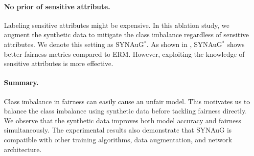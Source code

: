 \paragraph{No prior of sensitive attribute.}
Labeling sensitive attributes might be expensive.
In this ablation study, we augment the synthetic data to mitigate the class imbalance regardless of sensitive attributes.
We denote this setting as SYNAuG$^*$.
As shown in , SYNAuG$^*$ shows better fairness metrics compared to ERM.
However, exploiting the knowledge of sensitive attributes is more effective.

\paragraph{Summary.} 
Class imbalance in fairness can easily cause an unfair model.
This motivates us to balance the class imbalance using synthetic data before tackling fairness directly.
We observe that the synthetic data improves both model accuracy and fairness simultaneously.
The experimental results also demonstrate that SYNAuG is compatible with other training algorithms, data augmentation, and network architecture.




